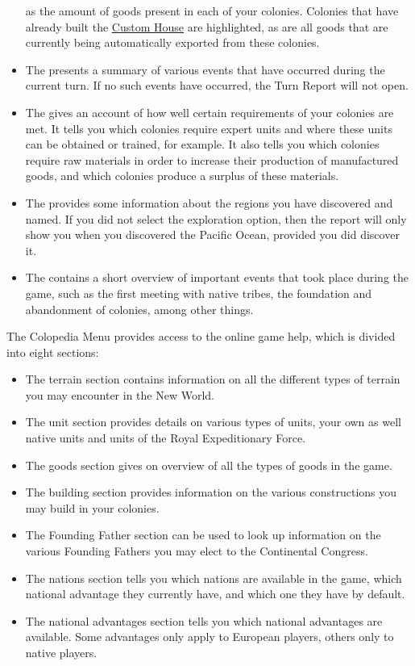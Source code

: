 \documentclass[12pt]{book}
\begin{document}
\begin{itemize}
as the amount of goods present in each of your colonies. Colonies that
have already built the \hyperlink{Custom House}{Custom House} are
highlighted, as are all goods that are currently being automatically
exported from these colonies.
\item The  presents a summary of various events
  that have occurred during the current turn. If no such events have
  occurred, the Turn Report will not open.
\item The  gives an account of how well
certain requirements of your colonies are met. It tells you which
colonies require expert units and where these units can be obtained or
trained, for example. It also tells you which colonies require raw
materials in order to increase their production of manufactured goods,
and which colonies produce a surplus of these materials.
\item The  provides some information about
  the regions you have discovered and named. If you did not select the
  exploration option, then the report will only show you when you
  discovered the Pacific Ocean, provided you did discover it.
\item The  contains a short overview of
  important events that took place during the game, such as the first
  meeting with native tribes, the foundation and abandonment of
  colonies, among other things.

\end{itemize}

The \hypertarget{colopedia menu}{Colopedia Menu} provides access to
the online game help, which is divided into eight sections:

\begin{itemize}
\item The terrain section contains information on all the different
types of terrain you may encounter in the New World.
\item The unit section provides details on various types of units,
your own as well native units and units of the Royal Expeditionary
Force.
\item The goods section gives on overview of all the types of goods in
the game.
\item The building section provides information on the various
constructions you may build in your colonies.
\item The Founding Father section can be used to look up information
on the various Founding Fathers you may elect to the Continental
Congress.
\item The nations section tells you which nations are available in the
  game, which national advantage they currently have, and which one
  they have by default.
\item The national advantages section tells you which national
  advantages are available. Some advantages only apply to European
  players, others only to native players.
\end{itemize}
\end{document}
